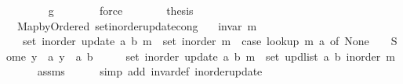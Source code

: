 \begin{isabellebody}
\ \ \ \ \ \ \isamarkupfalse%
\ g\isanewline
\ \ \ \ \ \ \isamarkupfalse%
\ force\isanewline
\ \ \ \ \isamarkupfalse%
\ \isamarkupfalse%
\ {\isacharquery}{\kern0pt}thesis\isanewline
\ \ \ \ \isacommand{{\isachardot}{\kern0pt}}\isamarkupfalse%
\isanewline
\ \ \isamarkupfalse%
\isanewline
{}\isamarkupfalse%
%
\endisatagproof
{\isafoldproof}%
%
\isadelimproof
\isanewline
%
\endisadelimproof
\isanewline
{}\isamarkupfalse%
\ {\isacharparenleft}{\kern0pt}\ Map{\isacharunderscore}{\kern0pt}by{\isacharunderscore}{\kern0pt}Ordered{\isacharparenright}{\kern0pt}\ set{\isacharunderscore}{\kern0pt}inorder{\isacharunderscore}{\kern0pt}update{\isacharunderscore}{\kern0pt}cong{\isacharcolon}{\kern0pt}\isanewline
\ \ \ {\isachardoublequoteopen}invar\ m{\isachardoublequoteclose}\isanewline
\ \ \ {\isachardoublequoteopen}set\ {\isacharparenleft}{\kern0pt}inorder\ {\isacharparenleft}{\kern0pt}update\ a\ b\ m{\isacharparenright}{\kern0pt}{\isacharparenright}{\kern0pt}\ {\isacharequal}{\kern0pt}\ set\ {\isacharparenleft}{\kern0pt}inorder\ m{\isacharparenright}{\kern0pt}\ {\isacharminus}{\kern0pt}\ {\isacharparenleft}{\kern0pt}case\ lookup\ m\ a\ of\ None\ {\isasymRightarrow}\ {\isacharbraceleft}{\kern0pt}{\isacharbraceright}{\kern0pt}\ {\isacharbar}{\kern0pt}\ Some\ y\ {\isasymRightarrow}\ {\isacharbraceleft}{\kern0pt}{\isacharparenleft}{\kern0pt}a{\isacharcomma}{\kern0pt}\ y{\isacharparenright}{\kern0pt}{\isacharbraceright}{\kern0pt}{\isacharparenright}{\kern0pt}\ {\isasymunion}\ {\isacharbraceleft}{\kern0pt}{\isacharparenleft}{\kern0pt}a{\isacharcomma}{\kern0pt}\ b{\isacharparenright}{\kern0pt}{\isacharbraceright}{\kern0pt}{\isachardoublequoteclose}\isanewline
%
\isadelimproof
%
\endisadelimproof
%
\isatagproof
{}\isamarkupfalse%
\ {\isacharminus}{\kern0pt}\isanewline
\ \ \isamarkupfalse%
\ {\isachardoublequoteopen}set\ {\isacharparenleft}{\kern0pt}inorder\ {\isacharparenleft}{\kern0pt}update\ a\ b\ m{\isacharparenright}{\kern0pt}{\isacharparenright}{\kern0pt}\ {\isacharequal}{\kern0pt}\ set\ {\isacharparenleft}{\kern0pt}upd{\isacharunderscore}{\kern0pt}list\ a\ b\ {\isacharparenleft}{\kern0pt}inorder\ m{\isacharparenright}{\kern0pt}{\isacharparenright}{\kern0pt}{\isachardoublequoteclose}\isanewline
\ \ \ \ \isamarkupfalse%
\ assms\isanewline
\ \ \ \ \isamarkupfalse%
\ {\isacharparenleft}{\kern0pt}simp\ add{\isacharcolon}{\kern0pt}\ invar{\isacharunderscore}{\kern0pt}def\ inorder{\isacharunderscore}{\kern0pt}update{\isacharparenright}{\kern0pt}\isanewline

\end{isabellebody}

